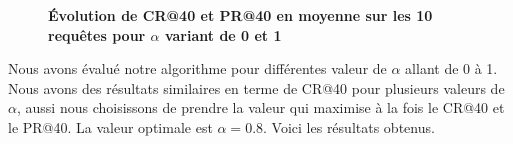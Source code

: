 \documentclass{article}
\begin{document}
\begin{figure}[htp]
 \textbf{ Évolution de CR@40 et PR@40 en moyenne sur les 10 requêtes pour $\alpha$ variant de 0 et 1 }
  \centering
  ~
\end{figure} 

Nous avons évalué notre algorithme pour différentes valeur de $\alpha$ allant de 0 à 1. Nous avons des résultats similaires en terme de CR@40 pour plusieurs valeurs de $\alpha$, aussi nous choisissons de prendre la valeur qui maximise à la fois le CR@40 et le PR@40. La valeur optimale est $\alpha = 0.8$. Voici les résultats obtenus.
\end{document}
